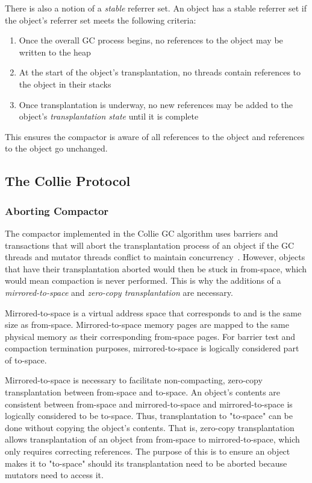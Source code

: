 \documentclass{sig-alternate}
\begin{document}
There is also a notion of a \emph{stable} referrer set. An object has a stable referrer 
set if the object's referrer set meets the following criteria:
\begin{enumerate}
\item Once the overall GC process begins, no references to the object may be written to the heap
\item At the start of the object's transplantation, no threads contain references to the object in their stacks
\item Once transplantation is underway, no new references may be added to the object's \emph{transplantation state} until it is complete
\end{enumerate}
This ensures the compactor is aware of all references to the object
and references to the object go unchanged.


\subsection{The Collie Protocol}
\label{sec:collieAlgorithm}


\subsubsection{Aborting Compactor}
\label{sec:collieAbortion}

The compactor implemented in the Collie GC algorithm uses barriers 
and transactions that will abort the transplantation process of an object if the
GC threads and mutator threads conflict to maintain concurrency~\cite{Iyengar:Collie}.
However, objects that have their transplantation aborted would then be stuck
in from-space, which would mean compaction is never performed. This is why
the additions of a \emph{mirrored-to-space} and \emph{zero-copy transplantation} are necessary.

Mirrored-to-space is a virtual address space that corresponds to and is the same
size as from-space. Mirrored-to-space memory pages are mapped to the same physical
memory as their corresponding from-space pages. For barrier test and compaction 
termination purposes, mirrored-to-space is logically considered part of to-space.

Mirrored-to-space is necessary to facilitate non-compacting, zero-copy transplantation 
between from-space and to-space. An object's contents are 
consistent between from-space and mirrored-to-space and mirrored-to-space
is logically considered to be to-space. Thus, transplantation to "to-space"
can be done without copying the object's contents. That is, zero-copy transplantation
allows transplantation of an object from from-space to mirrored-to-space, which only
requires correcting references. The purpose of this is to ensure
an object makes it to "to-space" should its transplantation need 
to be aborted because mutators need to access it.
\end{document}
